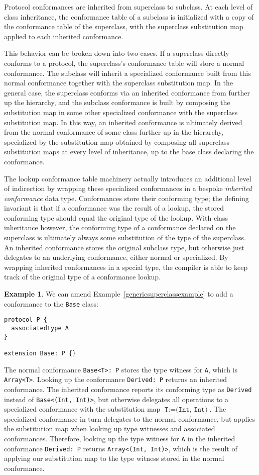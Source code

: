 \documentclass[a4paper,headsepline,bibliography=totoc,toc=flat,fleqn,twoside=semi]{scrbook}
\theoremstyle{definition}
\theoremstyle{definition}
\newtheorem{example}{Example}[chapter]
\theoremstyle{definition}
\begin{document}
Protocol conformances are inherited from superclass to subclass. At each level of class inheritance, the conformance table of a subclass is initialized with a copy of the conformance table of the superclass, with the superclass substitution map applied to each inherited conformance.

This behavior can be broken down into two cases. If a superclass directly conforms to a protocol, the superclass's conformance table will store a normal conformance. The subclass will inherit a specialized conformance built from this normal conformance together with the superclass substitution map. In the general case, the superclass conforms via an inherited conformance from further up the hierarchy, and the subclass conformance is built by composing the substitution map in some other specialized conformance with the superclass substitution map. In this way, an inherited conformance is ultimately derived from the normal conformance of some class further up in the hierarchy, specialized by the substitution map obtained by composing all superclass substitution maps at every level of inheritance, up to the base class declaring the conformance.

The lookup conformance table machinery actually introduces an additional level of indirection by wrapping these specialized conformances in a bespoke \emph{inherited conformance} data type. Conformances store their conforming type; the defining invariant is that if a conformance was the result of a lookup, the stored conforming type should equal the original type of the lookup. With class inheritance however, the conforming type of a conformance declared on the superclass is ultimately always some substitution of the type of the superclass. An inherited conformance stores the original subclass type, but otherwise just delegates to an underlying conformance, either normal or specialized. By wrapping inherited conformances in a special type, the compiler is able to keep track of the original type of a conformance lookup.
\begin{example}
We can amend Example~\ref{genericsuperclassexample} to add a conformance to the \texttt{Base} class:
\begin{Verbatim}
protocol P {
  associatedtype A
}

extension Base: P {}
\end{Verbatim}
The normal conformance \texttt{Base<T>:\ P} stores the type witness for \texttt{A}, which is \texttt{Array<T>}. Looking up the conformance \texttt{Derived:\ P} returns an inherited conformance. The inherited conformance reports its conforming type as \texttt{Derived} instead of \texttt{Base<(Int,~Int)>}, but otherwise delegates all operations to a specialized conformance with the substitution map $\texttt{T}:=\texttt{(Int, Int)}$. The specialized conformance in turn delegates to the normal conformance, but applies the substitution map when looking up type witnesses and associated conformances. Therefore, looking up the type witness for \texttt{A} in the inherited conformance \texttt{Derived:\ P} returns \texttt{Array<(Int,~Int)>}, which is the result of applying our substitution map to the type witness stored in the normal conformance.
\end{example}
\fi
\end{document}
